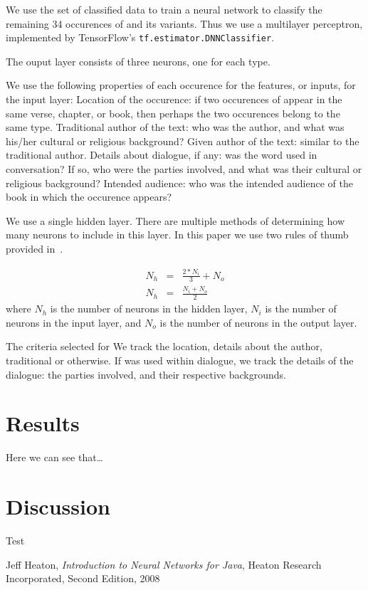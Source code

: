 \documentclass{article}
\newcommand{\entole}{\textepsilon\textnu\texttau\textomikron\textlambda\textepsilon\xspace}
\begin{document}
We use the set of classified data to train a neural network to classify the remaining 34
occurences of \entole and its variants.  Thus
we use a multilayer perceptron, implemented by TensorFlow's \texttt{tf.estimator.DNNClassifier}.

The ouput layer consists of three neurons, one for each type.

We use the following properties of each occurence for the features, or inputs, for the input layer:
Location of the occurence: if two occurences of \entole appear in the same verse, chapter, or book,
then perhaps the two occurences belong to the same type.  Traditional author of the text: who was
the author, and what was his/her cultural or religious background?  Given author of the text: similar
to the traditional author.  Details about dialogue, if any: was the word used in conversation?  If so,
who were the parties involved, and what was their cultural or religious background?  Intended audience:
who was the intended audience of the book in which the occurence appears?

We use a single hidden layer.  There are multiple methods of determining how many neurons
to include in this layer.  In this paper we use two rules of thumb provided in~\cite{Heaton2008}.

\begin{eqnarray}
    N_h & = & \frac{2 * N_i}{3} + N_o\\
    N_h & = & \frac{N_i + N_o}{2}
\end{eqnarray}
where $N_h$ is the number of neurons in the hidden layer, $N_i$ is the number of neurons in the input
layer, and $N_o$ is the number of neurons in the output layer.

The criteria selected for We track the location, details about the author, traditional or otherwise.
If \entole was used within dialogue, we track the details of the dialogue:
the parties involved, and their respective backgrounds.

\section{Results}
Here we can see that\ldots

\section{Discussion}
Test

\begin{thebibliography}{1}

    Jeff Heaton,
    \emph{Introduction to Neural Networks for Java},
    Heaton Research Incorporated,
    Second Edition,
    2008

\end{thebibliography}
\end{document}
